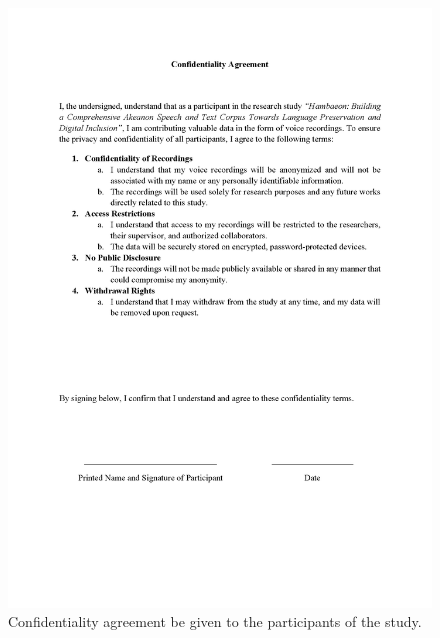 \begin{figure}[h!]
    \centering
    \includegraphics[width=\textwidth]{./appendix/letters_Page_3.png}
    \caption{Confidentiality agreement be given to the participants of the study.}
    \label{fig:confidentialityAgreement}
\end{figure}

